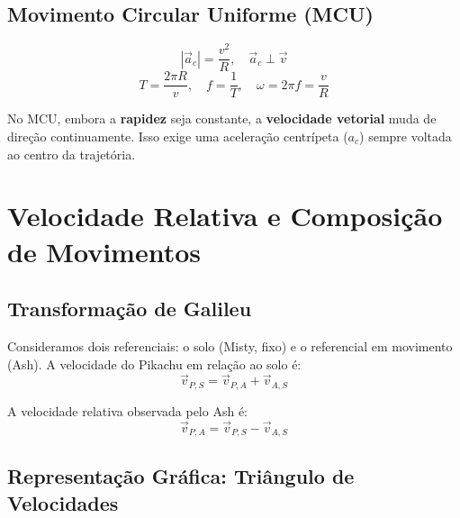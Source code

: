 \documentclass[10.5pt, a4paper]{extarticle}
\begin{document}
\subsection{Movimento Circular Uniforme (MCU)}

\[
  |\vec{a}_c| = \frac{v^2}{R}, \quad \vec{a}_c \perp \vec{v}
\]
\[
  T = \frac{2\pi R}{v}, \quad f = \frac{1}{T}, \quad \omega = 2\pi f = \frac{v}{R}
\]

\begin{squirtlebox}
No MCU, embora a \textbf{rapidez} seja constante, a \textbf{velocidade vetorial} muda de direção continuamente. Isso exige uma aceleração centrípeta ($a_c$) sempre voltada ao centro da trajetória.
\end{squirtlebox}

\section{Velocidade Relativa e Composição de Movimentos}

\subsection{Transformação de Galileu}

Consideramos dois referenciais: o solo (Misty, fixo) e o referencial em movimento (Ash). A velocidade do Pikachu em relação ao solo é:
\begin{equation}
  \vec{v}_{P,S} = \vec{v}_{P,A} + \vec{v}_{A,S}
\end{equation}

A velocidade relativa observada pelo Ash é:
\begin{equation}
  \vec{v}_{P,A} = \vec{v}_{P,S} - \vec{v}_{A,S}
\end{equation}

\subsection{Representação Gráfica: Triângulo de Velocidades}
\end{document}

